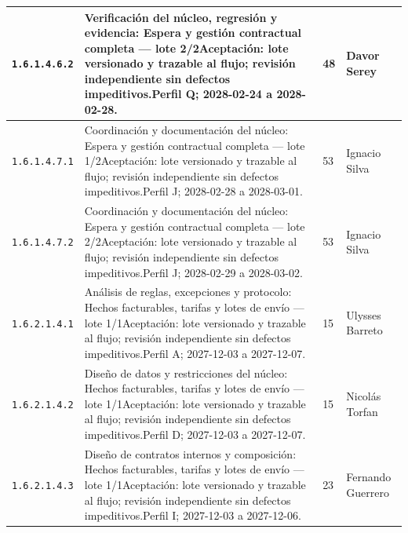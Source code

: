 \begin{longtable}{L{29mm}L{80mm}R{12mm}L{28mm}}
\texttt{1.\allowbreak{}6.\allowbreak{}1.\allowbreak{}4.\allowbreak{}6.\allowbreak{}2} & Verificación del núcleo, regresión y evidencia: Espera y gestión contractual completa — lote 2/2\newline Aceptación: lote versionado y trazable al flujo; revisión independiente sin defectos impeditivos.\newline Perfil Q; 2028-02-24 a 2028-02-28. & 48 & Davor Serey\\\hline
\texttt{1.\allowbreak{}6.\allowbreak{}1.\allowbreak{}4.\allowbreak{}7.\allowbreak{}1} & Coordinación y documentación del núcleo: Espera y gestión contractual completa — lote 1/2\newline Aceptación: lote versionado y trazable al flujo; revisión independiente sin defectos impeditivos.\newline Perfil J; 2028-02-28 a 2028-03-01. & 53 & Ignacio Silva\\\hline
\texttt{1.\allowbreak{}6.\allowbreak{}1.\allowbreak{}4.\allowbreak{}7.\allowbreak{}2} & Coordinación y documentación del núcleo: Espera y gestión contractual completa — lote 2/2\newline Aceptación: lote versionado y trazable al flujo; revisión independiente sin defectos impeditivos.\newline Perfil J; 2028-02-29 a 2028-03-02. & 53 & Ignacio Silva\\\hline
\texttt{1.\allowbreak{}6.\allowbreak{}2.\allowbreak{}1.\allowbreak{}4.\allowbreak{}1} & Análisis de reglas, excepciones y protocolo: Hechos facturables, tarifas y lotes de envío — lote 1/1\newline Aceptación: lote versionado y trazable al flujo; revisión independiente sin defectos impeditivos.\newline Perfil A; 2027-12-03 a 2027-12-07. & 15 & Ulysses Barreto\\\hline
\texttt{1.\allowbreak{}6.\allowbreak{}2.\allowbreak{}1.\allowbreak{}4.\allowbreak{}2} & Diseño de datos y restricciones del núcleo: Hechos facturables, tarifas y lotes de envío — lote 1/1\newline Aceptación: lote versionado y trazable al flujo; revisión independiente sin defectos impeditivos.\newline Perfil D; 2027-12-03 a 2027-12-07. & 15 & Nicolás Torfan\\\hline
\texttt{1.\allowbreak{}6.\allowbreak{}2.\allowbreak{}1.\allowbreak{}4.\allowbreak{}3} & Diseño de contratos internos y composición: Hechos facturables, tarifas y lotes de envío — lote 1/1\newline Aceptación: lote versionado y trazable al flujo; revisión independiente sin defectos impeditivos.\newline Perfil I; 2027-12-03 a 2027-12-06. & 23 & Fernando Guerrero\\\hline

\end{longtable}
